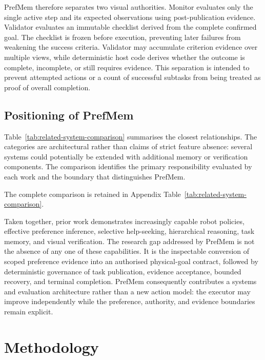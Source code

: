 \documentclass{article}
\begin{document}
PrefMem therefore separates two visual authorities. Monitor evaluates only the
single active step and its expected observations using post-publication
evidence. Validator evaluates an immutable checklist derived from the complete
confirmed goal. The checklist is frozen before execution, preventing later
failures from weakening the success criteria. Validator may accumulate
criterion evidence over multiple views, while deterministic host code derives
whether the outcome is complete, incomplete, or still requires evidence. This
separation is intended to prevent attempted actions or a count of successful
subtasks from being treated as proof of overall completion.

\subsection{Positioning of PrefMem}
\label{subsec:related-positioning}

Table~\ref{tab:related-system-comparison} summarises the closest relationships.
The categories are architectural rather than claims of strict feature absence:
several systems could potentially be extended with additional memory or
verification components. The comparison identifies the primary responsibility
evaluated by each work and the boundary that distinguishes PrefMem.

The complete comparison is retained in Appendix
Table~\ref{tab:related-system-comparison}.

Taken together, prior work demonstrates increasingly capable robot policies,
effective preference inference, selective help-seeking, hierarchical
reasoning, task memory, and visual verification. The research gap addressed by
PrefMem is not the absence of any one of these capabilities. It is the
inspectable conversion of scoped preference evidence into an authorised
physical-goal contract, followed by deterministic governance of task
publication, evidence acceptance, bounded recovery, and terminal completion.
PrefMem consequently contributes a systems and evaluation architecture rather
than a new action model: the executor may improve independently while the
preference, authority, and evidence boundaries remain explicit.


\section{Methodology}
\label{sec:methodology}
\end{document}
